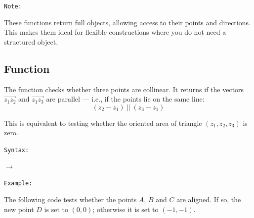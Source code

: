 \medskip
\texttt{Note: }

These functions return full  objects, allowing access to their points and directions. This makes them ideal for flexible constructions where you do not need a structured  object.

\subsection{Function }
\label{sub:function_islinear}

The function   checks whether three points are collinear. It returns  if the vectors $\overrightarrow{z_1z_2}$ and $\overrightarrow{z_1z_3}$ are parallel — i.e., if the points lie on the same line:
\[
(z_2 - z_1) \parallel (z_3 - z_1)
\]

This is equivalent to testing whether the oriented area of triangle $(z_1, z_2, z_3)$ is zero.

\medskip
\texttt{Syntax: }

\begin{center}
 $\rightarrow$ 
\end{center}

\texttt{Example: }

The following code tests whether the points $A$, $B$ and $C$ are aligned. If so, the new point $D$ is set to $(0, 0)$; otherwise it is set to $(-1, -1)$.

%

